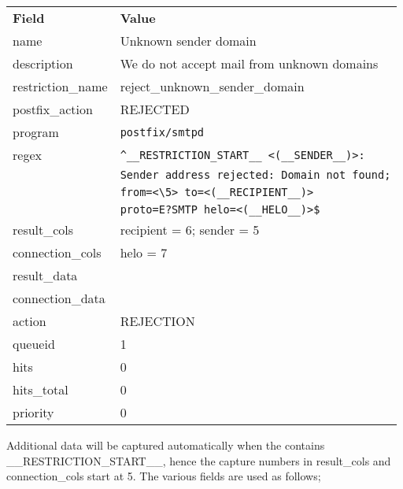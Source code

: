 \documentclass[a4paper,12pt,draft]{article}
\newcommand{\daemon}[1]{%
    \texttt{postfix/#1}%
}
\begin{document}
\begin{tabular}[]{ll}

\textbf{Field}      & \textbf{Value}                                    \\
name                & Unknown sender domain                             \\
description         & We do not accept mail from unknown domains        \\
restriction\_name   & reject\_unknown\_sender\_domain                   \\
postfix\_action     & REJECTED                                          \\
program             & \daemon{smtpd}                                    \\
regex               & \verb!^__RESTRICTION_START__ <(__SENDER__)>: !    \\
                    & \verb!Sender address rejected: Domain not found;! \\
                    & \verb!from=<\5> to=<(__RECIPIENT__)> !            \\
                    & \verb!proto=E?SMTP helo=<(__HELO__)>$!            \\
result\_cols        & recipient = 6; sender = 5                         \\
connection\_cols    & helo = 7                                          \\
result\_data        &                                                   \\
connection\_data    &                                                   \\
action              & REJECTION                                         \\
queueid             & 1                                                 \\
hits                & 0                                                 \\
hits\_total         & 0                                                 \\
priority            & 0                                                 \\

\end{tabular}

\vspace{1em}

Additional data will be captured automatically when the \regex{} contains 
\_\_RESTRICTION\_START\_\_, hence the capture numbers in result\_cols and
connection\_cols start at 5.  The various fields are used as follows;
\end{document}
